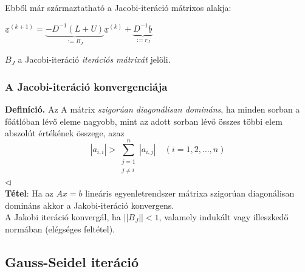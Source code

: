 \documentclass[tikz,12pt,margin=0px]{article}
\newcommand{\mybox}{%
    \collectbox{%
        \setlength{\fboxsep}{4pt}%
        \fbox{\BOXCONTENT}%
    }%
}
\begin{document}
    \noindent Ebből már származtatható a Jacobi-iteráció mátrixos alakja:
    \begin{center}
        \mybox{
        $\underline{x}^{(k+1)} = \underbrace{-D^{-1}(L + U)}_{:= B_{J}}\underline{x}^{(k)} + \underbrace{D^{-1}\underline{b}}_{:= r_{J}}$
        }
    \end{center}
	\noindent $B_{J}$ a Jacobi-iteráció \emph{iterációs mátrixát} jelöli.\\

    \subsubsection*{A Jacobi-iteráció konvergenciája\\}

    {\footnotesize \noindent {\color{blue} \faLightbulbO\ $\triangleright$ } }
    {\footnotesize
    \noindent \textbf{Definíció.} Az A mátrix \emph{szigorúan diagonálisan domináns}, ha minden sorban a főátlóban lévő eleme nagyobb, mint az adott sorban lévő összes többi elem abszolút értékének összege, azaz
    \[
        |a_{i,i}| > \sum_{\substack{j=1\\ j \not = i}}^{n} |a_{i,j}|\quad (i = 1, 2, \ldots, n)
    \]
    \noindent $\triangleleft$ \faLightbulbO}\\

    \noindent \textbf{Tétel}: Ha az $Ax = b$ lineáris egyenletrendszer mátrixa szigorúan diagonálisan domináns akkor a Jakobi-iteráció konvergens.\\

    \noindent A Jakobi iteráció konvergál, ha $||B_{J}|| < 1$, valamely indukált vagy illeszkedő normában (elégséges feltétel).

	\subsection*{Gauss-Seidel iteráció}
	
\end{document}
